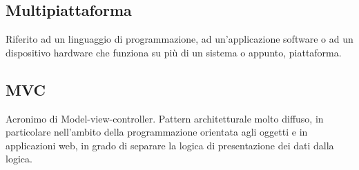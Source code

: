\subsection*{Multipiattaforma}
Riferito ad un linguaggio di programmazione, ad un'applicazione software o ad un dispositivo hardware che funziona su più di un sistema o appunto, piattaforma.

\subsection*{MVC}
Acronimo di Model-view-controller. Pattern architetturale molto diffuso, in particolare nell'ambito della programmazione orientata agli oggetti e in applicazioni web, in grado di separare la logica di presentazione dei dati dalla logica.